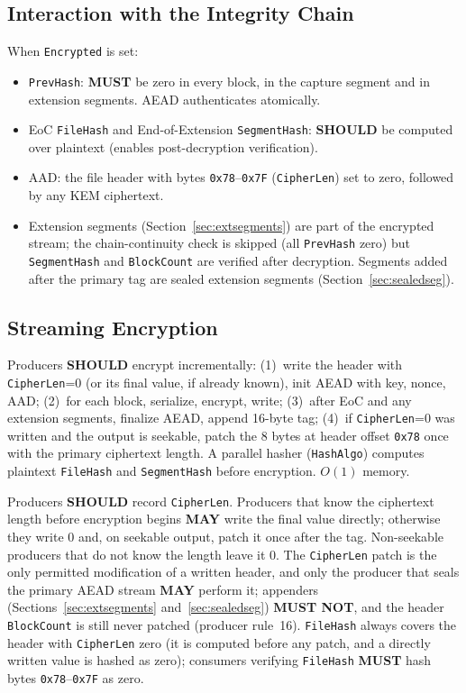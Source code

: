 \documentclass[11pt,a4paper]{article}
\newcommand{\MUST}{\textbf{MUST}}
\newcommand{\MUSTNOT}{\textbf{MUST NOT}}
\newcommand{\SHOULD}{\textbf{SHOULD}}
\newcommand{\MAY}{\textbf{MAY}}
\newcommand{\hex}[1]{\texttt{0x#1}}
\newcommand{\field}[1]{\texttt{#1}}
\begin{document}
\subsection{Interaction with the Integrity Chain}\label{sec:enc-integrity}
When \field{Encrypted} is set:
\begin{itemize}[leftmargin=1.5em, itemsep=2pt]
\item \field{PrevHash}: \MUST{} be zero in every block, in the capture segment and in extension segments. AEAD authenticates atomically.
\item EoC \field{FileHash} and End-of-Extension \field{SegmentHash}: \SHOULD{} be computed over plaintext (enables post-decryption verification).
\item AAD: the file header with bytes \hex{78}--\hex{7F} (\field{CipherLen}) set to zero, followed by any KEM ciphertext.
\item Extension segments (Section~\ref{sec:extsegments}) are part of the encrypted stream; the chain-continuity check is skipped (all \field{PrevHash} zero) but \field{SegmentHash} and \field{BlockCount} are verified after decryption. Segments added after the primary tag are sealed extension segments (Section~\ref{sec:sealedseg}).
\end{itemize}

\subsection{Streaming Encryption}\label{sec:streamenc}
Producers \SHOULD{} encrypt incrementally: (1)~write the header with \field{CipherLen}=0 (or its final value, if already known), init AEAD with key, nonce, AAD; (2)~for each block, serialize, encrypt, write; (3)~after EoC and any extension segments, finalize AEAD, append 16-byte tag; (4)~if \field{CipherLen}=0 was written and the output is seekable, patch the 8 bytes at header offset \hex{78} once with the primary ciphertext length. A parallel hasher (\field{HashAlgo}) computes plaintext \field{FileHash} and \field{SegmentHash} before encryption. $O(1)$ memory.

Producers \SHOULD{} record \field{CipherLen}. Producers that know the ciphertext length before encryption begins \MAY{} write the final value directly; otherwise they write 0 and, on seekable output, patch it once after the tag. Non-seekable producers that do not know the length leave it 0. The \field{CipherLen} patch is the only permitted modification of a written header, and only the producer that seals the primary AEAD stream \MAY{} perform it; appenders (Sections~\ref{sec:extsegments} and~\ref{sec:sealedseg}) \MUSTNOT{}, and the header \field{BlockCount} is still never patched (producer rule~16). \field{FileHash} always covers the header with \field{CipherLen} zero (it is computed before any patch, and a directly written value is hashed as zero); consumers verifying \field{FileHash} \MUST{} hash bytes \hex{78}--\hex{7F} as zero.
\end{document}
